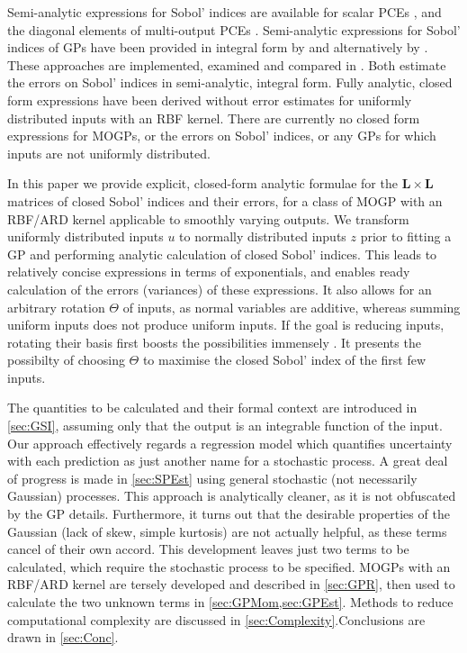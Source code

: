 \documentclass[preprint,12pt]{elsarticle}
\newcommand*{\x}{\times}
\newcommand*{\mi}[1]{\mathbf{#1}}
\begin{document}
    Semi-analytic expressions for Sobol' indices are available for scalar PCEs \cite{Sudret2008}, and the diagonal elements of multi-output PCEs \cite{GarciaCabrejo2014}.
    Semi-analytic expressions for Sobol' indices of GPs have been provided in integral form by \cite{Oakley.OHagan2004} and alternatively by \cite{Chen.etal2005}. These approaches are implemented, examined and compared in \cite{Marrel.etal2009,Srivastava.etal2017}. Both \cite{Oakley.OHagan2004,Marrel.etal2009} estimate the errors on Sobol' indices in semi-analytic, integral form. Fully analytic, closed form expressions have been derived without error estimates for uniformly distributed inputs \cite{Wu.etal2016a} with an RBF kernel. There are currently no closed form expressions for MOGPs, or the errors on Sobol' indices, or any GPs for which inputs are not uniformly distributed. 

    In this paper we provide explicit, closed-form analytic formulae for the $\mi{L}\x \mi{L}$ matrices of closed Sobol' indices and their errors, for a class of MOGP with an RBF/ARD kernel applicable to smoothly varying outputs. 
    We transform uniformly distributed inputs $u$ to normally distributed inputs $z$ prior to fitting a GP and performing analytic calculation of closed Sobol' indices. This leads to relatively concise expressions in terms of exponentials, and enables ready calculation of the errors (variances) of these expressions. It also allows for an arbitrary rotation $\Theta$ of inputs, as normal variables are additive, whereas summing uniform inputs does not produce uniform inputs. If the goal is reducing inputs, rotating their basis first boosts the possibilities immensely \cite{Constantine2015}. It presents the possibilty of choosing $\Theta$ to maximise the closed Sobol' index of the first few inputs.

    The quantities to be calculated and their formal context are introduced in \cref{sec:GSI}, assuming only that the output is an integrable function of the input. Our approach effectively regards a regression model which quantifies uncertainty with each prediction as just another name for a stochastic process. A great deal of progress is made in \cref{sec:SPEst} using general stochastic (not necessarily Gaussian) processes. This approach is analytically cleaner, as it is not obfuscated by the GP details. Furthermore, it turns out that the desirable properties of the Gaussian (lack of skew, simple kurtosis) are not actually helpful, as these terms cancel of their own accord. This development leaves just two terms to be calculated, which require the stochastic process to be specified. MOGPs with an RBF/ARD kernel are tersely developed and described in \cref{sec:GPR}, then used to calculate the two unknown terms in \cref{sec:GPMom,sec:GPEst}. Methods to reduce computational complexity are discussed in \cref{sec:Complexity}.Conclusions are drawn in \cref{sec:Conc}.
\end{document}
